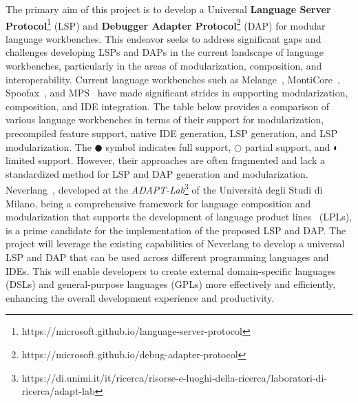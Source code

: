 The primary aim of this project is to develop a Universal \textbf{Language Server Protocol}\footnote{https://microsoft.github.io/language-server-protocol} (LSP) and \textbf{Debugger Adapter Protocol}\footnote{https://microsoft.github.io/debug-adapter-protocol} (DAP) for modular language workbenches. This endeavor seeks to address significant gaps and challenges developing LSPs and DAPs in the current landscape of language workbenches, particularly in the areas of modularization, composition, and interoperability. Current language workbenches such as Melange~\cite{Degueule15}, MontiCore~\cite{Krahn10}, Spoofax~\cite{Visser10}, and MPS~\cite{Volter11, Voelter12} have made significant strides in supporting modularization, composition, and IDE integration.
The table below provides a comparison of various language workbenches in terms of their support for modularization, precompiled feature support, native IDE generation, LSP generation, and LSP modularization. The $\CIRCLE$ symbol indicates full support, $\Circle$ partial support, and $\LEFTcircle$ limited support.
However, their approaches are often fragmented and lack a standardized method for LSP and DAP generation and modularization.
Neverlang~\cite{Cazzola15c, Cazzola14c}, developed at the \textit{ADAPT-Lab}\footnote{https://di.unimi.it/it/ricerca/risorse-e-luoghi-della-ricerca/laboratori-di-ricerca/adapt-lab} of the Università degli Studi di Milano, being a comprehensive framework for language composition and modularization that supports the development of language product lines~\cite{Cazzola15f, Cazzola21b} (LPLs), is a prime candidate for the implementation of the proposed LSP and DAP. The project will leverage the existing capabilities of Neverlang to develop a universal LSP and DAP that can be used across different programming languages and IDEs. This will enable developers to create external domain-specific languages~\cite{Fowler10} (DSLs) and general-purpose languages (GPLs) more effectively and efficiently, enhancing the overall development experience and productivity.

